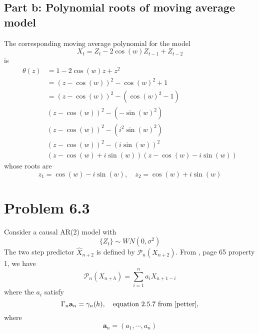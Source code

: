 \documentclass[11pt, oneside]{article}   	%
\begin{document}
 \subsection{Part b: Polynomial roots of moving average model}
 The corresponding moving average polynomial for the model
 \begin{equation}
 X_{t} = Z_{t}  -2\cos(w)Z_{t-1} + Z_{t-2}
 \end{equation}
  is 
 \begin{equation}
 \begin{split}
 \theta(z) &= 1-2\cos(w)z + z^{2}\\
 &=(z-\cos(w))^{2} - \cos(w)^{2} +1 \\
 &=(z-\cos(w))^{2} - (\cos(w)^{2} -1) \\
 &(z-\cos(w))^{2}  - (-\sin(w)^{2})\\
 &(z-\cos(w))^{2}  - (i^{2}\sin(w)^{2})\\
 &(z-\cos(w))^{2}  - (i\sin(w))^{2}\\
&(z-\cos(w) + i\sin(w))(z-\cos(w) - i\sin(w))
 \end{split}
 \end{equation}
 whose roots are 
 \begin{equation}
 z_{1} = \cos(w) -i\sin(w), \quad  z_{2} = \cos(w) +i\sin(w)
 \end{equation}
 
 
 \section{Problem 6.3}
 Consider a causal AR(2) model with 
 \begin{equation}
 \{Z_{t} \} \sim WN(0,\sigma^{2})
  \end{equation}
 The two step predictor $\widehat{X}_{n+2}$ is defined by $\mathcal{P}_{n}(X_{n+2})$. From \cite{petter}, page 65 property 1,
 we have 
 \begin{equation}\label{eq:pn}
\mathcal{P}_{n}(X_{n+h}) = \sum_{i=1}^{n}a_{i}X_{n+1-i}
\end{equation} 
 where the $a_{i}$ satisfy
 \begin{equation}
 \Gamma_{n}\textbf{a}_{n} = \gamma_{n}(h), \quad \text{equation 2.5.7 from \cite{petter}},
 \end{equation}
 where
 \begin{equation}
 \textbf{a}_{n} = (a_{1}, \cdots,a_{n})
 \end{equation}
 
\end{document}
